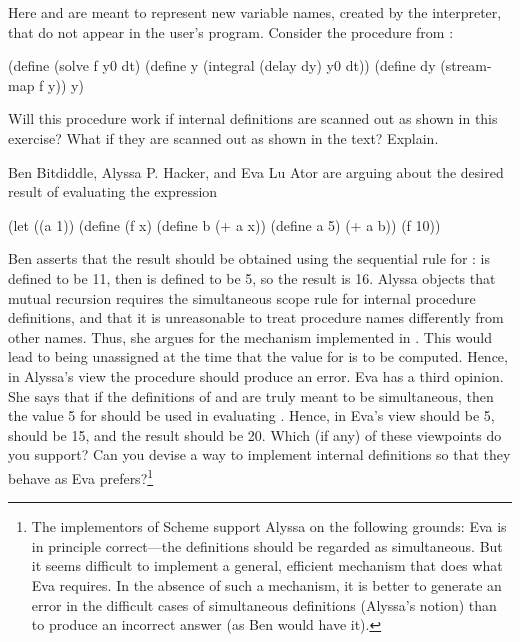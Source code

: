 \begin{exerciseGroup}
Here  and  are meant to represent new variable names, created
by the interpreter, that do not appear in the user's program.  Consider the
 procedure from :

\begin{codeBlock}
(define (solve f y0 dt)
  (define  y (integral (delay dy) y0 dt))
  (define dy (stream-map f y))
  y)
\end{codeBlock}

Will this procedure work if internal definitions are scanned out as shown in
this exercise?  What if they are scanned out as shown in the text?  Explain.

\label{Exercise 4.19}
 Ben Bitdiddle, Alyssa P. Hacker,
and Eva Lu Ator are arguing about the desired result of evaluating the
expression

\begin{codeBlock}
(let ((a 1))
  (define (f x)
    (define b (+ a x))
    (define a 5)
    (+ a b))
  (f 10))
\end{codeBlock}

Ben asserts that the result should be obtained using the sequential rule for
:  is defined to be 11, then  is defined to be 5,
so the result is 16.  Alyssa objects that mutual recursion requires the
simultaneous scope rule for internal procedure definitions, and that it is
unreasonable to treat procedure names differently from other names.  Thus, she
argues for the mechanism implemented in .  This would lead
to  being unassigned at the time that the value for  is to be
computed.  Hence, in Alyssa's view the procedure should produce an error.  Eva
has a third opinion.  She says that if the definitions of  and 
are truly meant to be simultaneous, then the value 5 for  should be
used in evaluating .  Hence, in Eva's view  should be 5,
 should be 15, and the result should be 20.  Which (if any) of these
viewpoints do you support?  Can you devise a way to implement internal
definitions so that they behave as Eva prefers?\footnote{The 
implementors of Scheme support Alyssa on the following grounds: Eva is in
principle correct---the definitions should be regarded as simultaneous.  But
it seems difficult to implement a general, efficient mechanism that does what
Eva requires.  In the absence of such a mechanism, it is better to generate an
error in the difficult cases of simultaneous definitions (Alyssa's notion) than
to produce an incorrect answer (as Ben would have it).}


\end{exerciseGroup}
